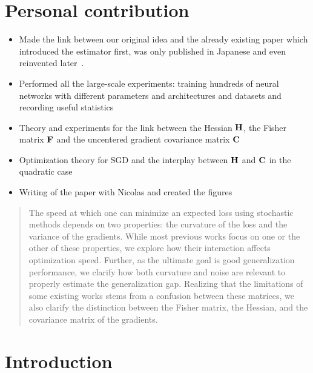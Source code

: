 \section*{Personal contribution}
\begin{itemize}
    \item Made the link between our original idea and the already existing paper \citet{takeuchi1976distribution} which introduced the estimator first, was only published in Japanese and even reinvented later~\citep{murata1994network}.
    \item Performed all the large-scale experiments: training hundreds of neural networks with different parameters and architectures and datasets and recording useful statistics
    \item Theory and experiments for the link between the Hessian ${\mathbf{H}}$, the Fisher matrix ${\mathbf{F}}$ and the uncentered gradient covariance matrix ${\mathbf{C}}$
    \item Optimization theory for SGD and the interplay between ${\mathbf{H}}$ and ${\mathbf{C}}$ in the quadratic case
    \item Writing of the paper with Nicolas and created the figures
\end{itemize}

\begin{abstract}
    The speed at which one can minimize an expected loss using stochastic methods depends on two properties: the curvature of the loss and the variance of the gradients. While most previous works focus on one or the other of these properties, we explore how their interaction affects optimization speed. Further, as the ultimate goal is good generalization performance, we clarify how both curvature and noise are relevant to properly estimate the generalization gap. Realizing that the limitations of some existing works stems from a confusion between these matrices, we also clarify the distinction between the Fisher matrix, the Hessian, and the covariance matrix of the gradients.
\end{abstract}

\setcounter{footnote}{0}

\section{Introduction}


